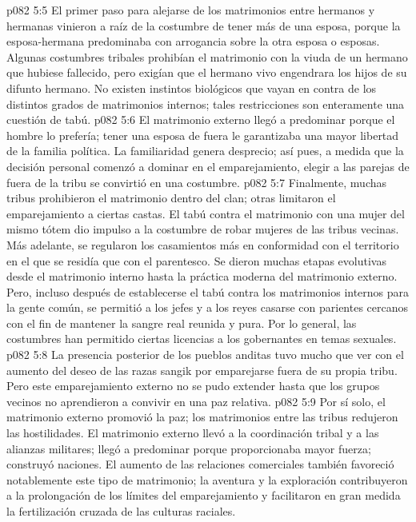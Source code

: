 \vs p082 5:5 El primer paso para alejarse de los matrimonios entre hermanos y hermanas vinieron a raíz de la costumbre de tener más de una esposa, porque la esposa\hyp{}hermana predominaba con arrogancia sobre la otra esposa o esposas. Algunas costumbres tribales prohibían el matrimonio con la viuda de un hermano que hubiese fallecido, pero exigían que el hermano vivo engendrara los hijos de su difunto hermano. No existen instintos biológicos que vayan en contra de los distintos grados de matrimonios internos; tales restricciones son enteramente una cuestión de tabú.
\vs p082 5:6 \pc El matrimonio externo llegó a predominar porque el hombre lo prefería; tener una esposa de fuera le garantizaba una mayor libertad de la familia política. La familiaridad genera desprecio; así pues, a medida que la decisión personal comenzó a dominar en el emparejamiento, elegir a las parejas de fuera de la tribu se convirtió en una costumbre.
\vs p082 5:7 Finalmente, muchas tribus prohibieron el matrimonio dentro del clan; otras limitaron el emparejamiento a ciertas castas. El tabú contra el matrimonio con una mujer del mismo tótem dio impulso a la costumbre de robar mujeres de las tribus vecinas. Más adelante, se regularon los casamientos más en conformidad con el territorio en el que se residía que con el parentesco. Se dieron muchas etapas evolutivas desde el matrimonio interno hasta la práctica moderna del matrimonio externo. Pero, incluso después de establecerse el tabú contra los matrimonios internos para la gente común, se permitió a los jefes y a los reyes casarse con parientes cercanos con el fin de mantener la sangre real reunida y pura. Por lo general, las costumbres han permitido ciertas licencias a los gobernantes en temas sexuales.
\vs p082 5:8 La presencia posterior de los pueblos anditas tuvo mucho que ver con el aumento del deseo de las razas sangik por emparejarse fuera de su propia tribu. Pero este emparejamiento externo no se pudo extender hasta que los grupos vecinos no aprendieron a convivir en una paz relativa.
\vs p082 5:9 Por sí solo, el matrimonio externo promovió la paz; los matrimonios entre las tribus redujeron las hostilidades. El matrimonio externo llevó a la coordinación tribal y a las alianzas militares; llegó a predominar porque proporcionaba mayor fuerza; construyó naciones. El aumento de las relaciones comerciales también favoreció notablemente este tipo de matrimonio; la aventura y la exploración contribuyeron a la prolongación de los límites del emparejamiento y facilitaron en gran medida la fertilización cruzada de las culturas raciales.
